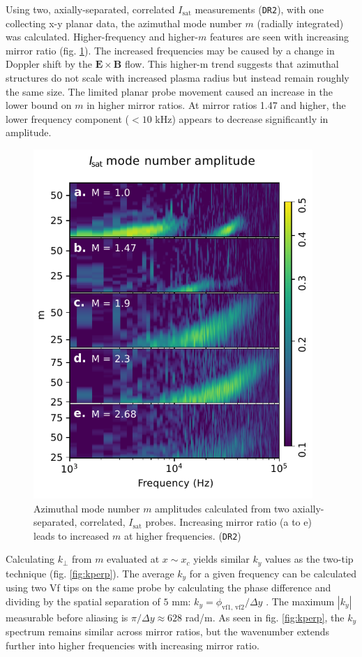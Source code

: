 Using two, axially-separated, correlated $I_\text{sat}$ measurements (\texttt{DR2}), with one collecting x-y planar data, the azimuthal mode number $m$ (radially integrated) was calculated. Higher-frequency and higher-$m$ features are seen with increasing mirror ratio (fig. \ref{fig:isat-m-num}). The increased frequencies may be caused by a  change in Doppler shift by the $\boldsymbol{E \times B}$ flow. This higher-m trend suggests that azimuthal structures do not scale with increased plasma radius but instead remain roughly the same size. The limited planar probe movement caused an increase in the lower bound on $m$  in higher mirror ratios. At mirror ratios 1.47 and higher, the lower frequency component ($< 10$ kHz) appears to decrease significantly in amplitude. 
\begin{figure}
    \centering
    \includegraphics[width=300pt]{figures/fig17.pdf}
    \caption{Azimuthal mode number $m$ amplitudes calculated from two axially-separated, correlated, $I_\text{sat}$ probes. Increasing mirror ratio (a to e) leads to increased $m$ at higher frequencies. (\texttt{DR2})}
    \label{fig:isat-m-num}
\end{figure}
Calculating $k_\perp$ from $m$ evaluated at $x \sim x_c$ yields similar $k_y$ values as the two-tip technique (fig. \ref{fig:kperp}). The average $k_y$ for a given frequency can be calculated using two Vf tips on the same probe by calculating the phase difference and dividing by the spatial separation of $5$ mm: $k_y = \phi_{\text{vf1, vf2}} / \Delta y$ \cite{Powers-twoprobe-ky}. The maximum $|k_y|$ measurable before aliasing is $\pi / \Delta y \approx 628$ rad/m. As seen in fig. \ref{fig:kperp}, the $k_y$ spectrum remains similar across mirror ratios, but the wavenumber extends further into higher frequencies with increasing mirror ratio. 
